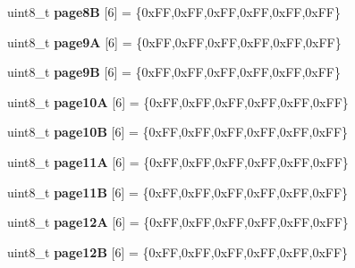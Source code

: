 \begin{DoxyCompactItemize}
\item 
\mbox{\label{structnfc_1_1cardKeys_a7ee94ac8bd390d9fbe2e17a20eef2920}} 
uint8\+\_\+t {\bfseries page8B} \mbox{[}6\mbox{]} = \{0x\+F\+F,0x\+F\+F,0x\+F\+F,0x\+F\+F,0x\+F\+F,0x\+F\+F\}
\item 
\mbox{\label{structnfc_1_1cardKeys_a31d411e5d5ad479877bd1b43c718e4f4}} 
uint8\+\_\+t {\bfseries page9A} \mbox{[}6\mbox{]} = \{0x\+F\+F,0x\+F\+F,0x\+F\+F,0x\+F\+F,0x\+F\+F,0x\+F\+F\}
\item 
\mbox{\label{structnfc_1_1cardKeys_a3f69bdf50b32ce1359e030e771091482}} 
uint8\+\_\+t {\bfseries page9B} \mbox{[}6\mbox{]} = \{0x\+F\+F,0x\+F\+F,0x\+F\+F,0x\+F\+F,0x\+F\+F,0x\+F\+F\}
\item 
\mbox{\label{structnfc_1_1cardKeys_a175f216c9aba4b0c68beb4ffa3cce857}} 
uint8\+\_\+t {\bfseries page10A} \mbox{[}6\mbox{]} = \{0x\+F\+F,0x\+F\+F,0x\+F\+F,0x\+F\+F,0x\+F\+F,0x\+F\+F\}
\item 
\mbox{\label{structnfc_1_1cardKeys_affb42cc5ae80ece77f452886c13b846e}} 
uint8\+\_\+t {\bfseries page10B} \mbox{[}6\mbox{]} = \{0x\+F\+F,0x\+F\+F,0x\+F\+F,0x\+F\+F,0x\+F\+F,0x\+F\+F\}
\item 
\mbox{\label{structnfc_1_1cardKeys_a88581f934e14ed0522231c4a07994ac1}} 
uint8\+\_\+t {\bfseries page11A} \mbox{[}6\mbox{]} = \{0x\+F\+F,0x\+F\+F,0x\+F\+F,0x\+F\+F,0x\+F\+F,0x\+F\+F\}
\item 
\mbox{\label{structnfc_1_1cardKeys_a56f47361544a0b33978628697e6744d6}} 
uint8\+\_\+t {\bfseries page11B} \mbox{[}6\mbox{]} = \{0x\+F\+F,0x\+F\+F,0x\+F\+F,0x\+F\+F,0x\+F\+F,0x\+F\+F\}
\item 
\mbox{\label{structnfc_1_1cardKeys_a56175a128140e8a81f851112fdc75775}} 
uint8\+\_\+t {\bfseries page12A} \mbox{[}6\mbox{]} = \{0x\+F\+F,0x\+F\+F,0x\+F\+F,0x\+F\+F,0x\+F\+F,0x\+F\+F\}
\item 
\mbox{\label{structnfc_1_1cardKeys_a4deb55f4cdc14411da78e31a8601758e}} 
uint8\+\_\+t {\bfseries page12B} \mbox{[}6\mbox{]} = \{0x\+F\+F,0x\+F\+F,0x\+F\+F,0x\+F\+F,0x\+F\+F,0x\+F\+F\}

\end{DoxyCompactItemize}
